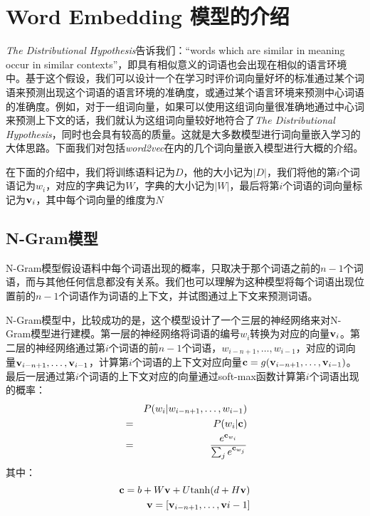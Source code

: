 \iffalse



\fi

\chapter{Word Embedding 模型的介绍}
\label{chap:w2v}

\emph{The Distributional Hypothesis}告诉我们：``words which are similar in meaning occur in similar contexts''\citep{rubenstein1965contextual}，即具有相似意义的词语也会出现在相似的语言环境中。基于这个假设，我们可以设计一个在学习时评价词向量好坏的标准\mydash 通过某个词语来预测出现这个词语的语言环境的准确度，或通过某个语言环境来预测中心词语的准确度。例如，对于一组词向量，如果可以使用这组词向量很准确地通过中心词来预测上下文的话，我们就认为这组词向量较好地符合了\emph{The Distributional Hypothesis}，同时也会具有较高的质量。这就是大多数模型进行词向量嵌入学习的大体思路。下面我们对包括\emph{word2vec}在内的几个词向量嵌入模型进行大概的介绍。

在下面的介绍中，我们将训练语料记为$D$，他的大小记为$|D|$，我们将他的第$i$个词语记为$w_i$，对应的字典记为$W$，字典的大小记为$|W|$，最后将第$i$个词语的词向量标记为${{\mathbf v}}_i$，其中每个词向量的维度为$N$

\section{N-Gram模型}

N-Gram模型假设语料中每个词语出现的概率，只取决于那个词语之前的$n-1$个词语，而与其他任何信息都没有关系。我们也可以理解为这种模型将每个词语出现位置前的$n-1$个词语作为词语的上下文，并试图通过上下文来预测词语。

N-Gram模型中，比较成功的是\cite{bengio2006neural}，这个模型设计了一个三层的神经网络来对N-Gram模型进行建模。第一层的神经网络将词语的编号$w_i$转换为对应的向量${{\mathbf v}}_i$。第二层的神经网络通过第$i$个词语的前$n-1$个词语，$w_{i-n+1}, \dots , w_{i-1}$，对应的词向量${{\mathbf v}}_{i-n+1}, \dots , {{\mathbf v}}_{i-1}$，计算第$i$个词语的上下文对应向量${{\mathbf c}} = g({{\mathbf v}}_{i-n+1}, \dots, {{\mathbf v}}_{i-1})$。最后一层通过第$i$个词语的上下文对应的向量通过soft-max函数计算第$i$个词语出现的概率：
\begin{eqnarray*}
&&P(w_i| w_{i-n+1}, \dots, w_{i-1}) \\
&=& P(w_i | {{\mathbf c}}) \\
&=& \frac{e^{{{\mathbf c}}_{w_i}}}{\sum_j e^{{{\mathbf c}}_{w_j}}}
\end{eqnarray*}
其中：
\begin{eqnarray*}
{{\mathbf c}} = b + W{{\mathbf v}} + U \mathrm{tanh}(d+H{{\mathbf v}}) \\
{{\mathbf v}} = [{{\mathbf v}}_{i-n+1}, \dots, {{\mathbf v}}{i-1}]
\end{eqnarray*}

